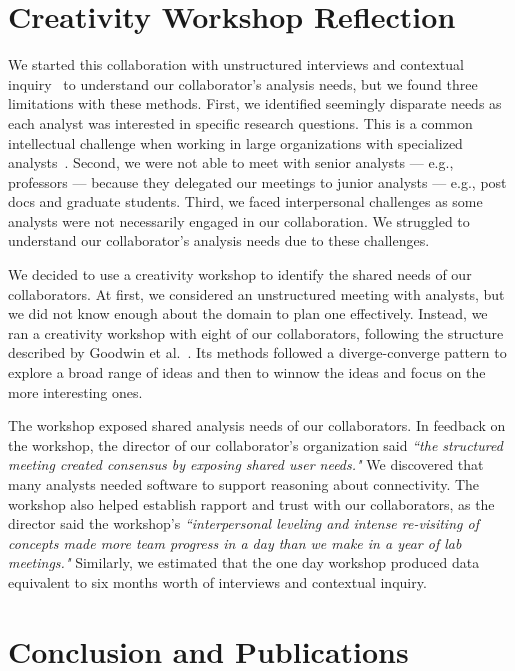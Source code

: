 \section{Creativity Workshop Reflection}

We started this collaboration with unstructured interviews and contextual inquiry~\cite{Holtzblatt1993} to understand our collaborator's analysis needs, but we found three limitations with these methods. First, we identified seemingly disparate needs as each analyst was interested in specific research questions. This is a common intellectual challenge when working in large organizations with specialized analysts~\cite{Sedlmair2010}. Second, we were not able to meet with senior analysts --- e.g., professors --- because they delegated our meetings to junior analysts --- e.g., post docs and graduate students. Third, we faced interpersonal challenges as some analysts were not necessarily engaged in our collaboration. We struggled to understand our collaborator's analysis needs due to these challenges.

We decided to use a creativity workshop to identify the shared needs of our collaborators. At first, we considered an unstructured meeting with analysts, but we did not know enough about the domain to plan one effectively. Instead, we ran a creativity workshop with eight of our collaborators, following the structure described by Goodwin et al.~\cite{Goodwin2013}. Its methods followed a diverge-converge pattern to explore a broad range of ideas and then to winnow the ideas and focus on the more interesting ones.

The workshop exposed shared analysis needs of our collaborators. In feedback on the workshop, the director of our collaborator's organization said \emph{``the structured meeting created consensus by exposing shared user needs."} We discovered that many analysts needed software to support reasoning about connectivity. The workshop also helped establish rapport and trust with our collaborators, as the director said the workshop's \emph{``interpersonal leveling and intense re-visiting of concepts made more team progress in a day than we make in a year of lab meetings."} Similarly, we estimated that the one day workshop produced data equivalent to six months worth of interviews and contextual inquiry.

\section{Conclusion and Publications}

